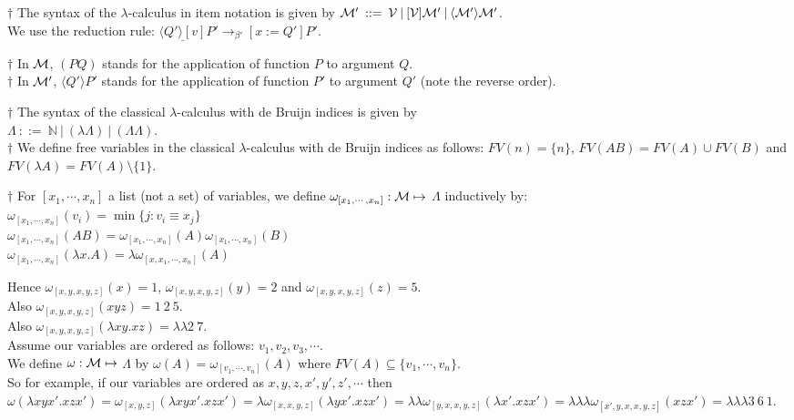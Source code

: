 \documentclass[11pt]{article}
\begin{document}
$\dagger$ The syntax of the  $\lambda$-calculus in item notation is given by
${\cal M}'  \: ::=  \:  {\cal V} \:|\: [{\cal V}]{\cal M}' \:|\: \langle{\cal M}'\rangle{\cal M}'$.\\
We use the reduction rule: 
$ \underline{\langle Q'\rangle[v]}P' \rightarrow_{\beta'} [x:=Q']P'$.

$\dagger$ In ${\cal M}$, $(PQ)$ stands for the application of function $P$ to argument $Q$.\\
$\dagger$ In ${\cal M}'$, $\langle Q'\rangle P'$ stands for the application of function $P'$ to argument $Q'$ (note the reverse order).

$\dagger$ The syntax of the classical $\lambda$-calculus with de Bruijn indices is given by\\
$\Lambda  \: ::=  \:  {\mathbb{N}} \:|\: ( \lambda{}{\Lambda}) \:|\: ( \Lambda \Lambda)$.\\

$\dagger$ We define free variables in 
the classical $\lambda$-calculus with de Bruijn indices as follows:
$FV(n) = \{n\}$, $FV(AB) = FV(A)\cup FV(B)$ and $FV(\lambda A) = FV(A)\setminus\{1\}$.

$\dagger$  For $[x_1,\cdots, x_n]$ a list (not a set) of variables, 
we define $\omega_{[x_1,\cdots, x_n]}: {\cal M} \mapsto$ $\Lambda$ inductively by:\\
$\omega_{[x_1,\cdots, x_n]}(v_i) = \min\{j:v_i \equiv x_j\}$\\
$\omega_{[x_1,\cdots, x_n]}(AB) = \omega_{[x_1,\cdots, x_n]}(A)\omega_{[x_1,\cdots, x_n]}(B)$\\
$\omega_{[x_1,\cdots, x_n]}(\lambda x.A)= \lambda \omega_{[x,x_1,\cdots, x_n]}(A)$

Hence $\omega_{[x, y, x,y,z]}(x) = 1$, $\omega_{[x, y, x,y,z]}(y) = 2$ and $\omega_{[x, y, x,y,z]}(z) = 5$.\\
Also $\omega_{[x, y, x,y,z]}(xyz) = 1\:2\:5$.\\
Also $\omega_{[x, y, x,y,z]}(\lambda xy.xz) = \lambda \lambda 2\:7$.\\

Assume our variables are ordered as follows: $v_1, v_2, v_3, \cdots$.\\
We define $\omega : {\cal M} \mapsto$ $\Lambda$
by $\omega(A) = \omega_{[v_1,\cdots, v_n]}(A)$ where 
$FV(A) \subseteq \{v_1,\cdots,v_n\}$.\\
So for example, if our variables are ordered as $x,y,z,x',y',z', \cdots$ then $\omega(\lambda xyx'.xzx')
= \omega_{[x,y,z]}(\lambda xyx'.xzx') = \lambda\omega_{[x,x,y,z]}(\lambda yx'.xzx') = \lambda\lambda\omega_{[y,x,x,y,z]}(\lambda x'.xzx') = \lambda\lambda\lambda\omega_{[x',y,x,x,y,z]}(xzx') = \lambda\lambda\lambda 3\:6\:1$.
\end{document}
